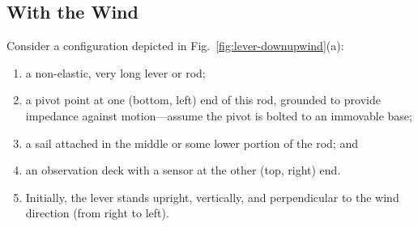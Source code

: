 \documentclass[reprint,aps,pra,superscriptaddress,longbibliography]{revtex4-2}
\begin{document}
\subsection{With the Wind}

Consider a configuration depicted in Fig.~\ref{fig:lever-downupwind}(a):
\begin{enumerate}
\item  a non-elastic, very long lever or rod;
\item a pivot point at one (bottom, left) end of this rod, grounded to provide impedance against motion---assume the pivot is bolted to an immovable base;
\item a sail attached in the middle or some lower portion of the rod; and
\item an observation deck with a sensor at the other (top, right) end.
\item Initially, the lever stands upright, vertically, and perpendicular to the wind direction (from right to left).
\end{enumerate}
\end{document}

